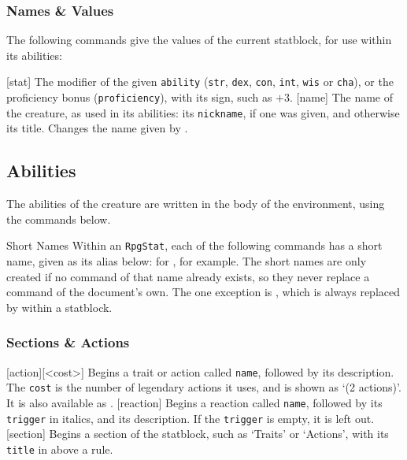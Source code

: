 		\subsubsection{Names \& Values}

			The following commands give the values of the current statblock, for use within its abilities:

			[stat]{}
			{
				The modifier of the given \texttt{ability} (\texttt{str}, \texttt{dex}, \texttt{con}, \texttt{int}, \texttt{wis} or \texttt{cha}), or the proficiency bonus (\texttt{proficiency}), with its sign, such as $+3$.
			}
			[name]
			{
				The name of the creature, as used in its abilities: its \texttt{nickname}, if one was given, and otherwise its title.
			}
			{
				Changes the name given by .
			}

	\subsection{Abilities}\label{S:DndStatAbilities}

		The abilities of the creature are written in the body of the environment, using the commands below.

		\begin{RpgSidebar}{Short Names}
			Within an \texttt{RpgStat}, each of the following commands has a short name, given as its alias below:  for , for example. The short names are only created if no command of that name already exists, so they never replace a command of the document's own. The one exception is , which is always replaced by  within a statblock.
		\end{RpgSidebar}

		\subsubsection{Sections \& Actions}



			[action]{[<cost>]}
			{
				Begins a trait or action called \texttt{name}, followed by its description. The \texttt{cost} is the number of legendary actions it uses, and is shown as `(2 actions)'. It is also available as .
			}
			[reaction]{}
			{
				Begins a reaction called \texttt{name}, followed by its \texttt{trigger} in italics, and its description. If the \texttt{trigger} is empty, it is left out.
			}
			{}
			{
				Begins a section of the statblock, such as `Traits' or `Actions', with its \texttt{title} in  above a rule.
			}

